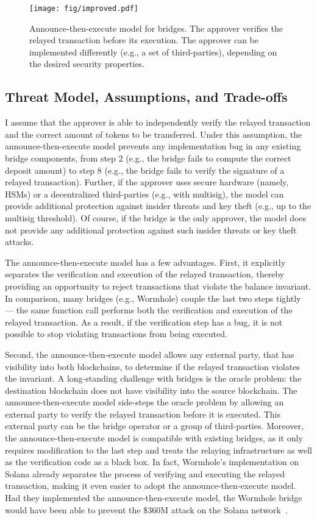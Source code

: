 \begin{figure}[t]
\centering
\texttt{[image: fig/improved.pdf]}
\caption[Announce-then-Execute Model for Bridges]{Announce-then-execute model for bridges. The approver verifies the relayed transaction before its execution. The approver can be implemented differently (e.g., a set of third-parties), depending on the desired security properties.}
\label{fig:improved-arch}
\end{figure}


\subsection{Threat Model, Assumptions, and Trade-offs}
I assume that the approver is able to independently verify the relayed transaction and the correct amount of tokens to be transferred. Under this assumption, the announce-then-execute model prevents any implementation bug in any existing bridge components, from step 2 (e.g., the bridge fails to compute the correct deposit amount) to step 8 (e.g., the bridge fails to verify the signature of a relayed transaction). Further, if the 
approver uses secure hardware (namely, HSMs) or a decentralized third-parties
(e.g., with multisig), the model can provide additional protection against
insider threats and key theft (e.g., up to the multisig threshold). Of course,
if the bridge is the only approver, the model does not provide any additional
protection against such insider threats or key theft attacks.


The announce-then-execute model has a few advantages. First, it
explicitly separates the verification and execution of the relayed
transaction, thereby providing an opportunity to reject transactions
that violate the balance invariant.  In comparison, many bridges (e.g.,
Wormhole) couple the last two steps tightly --- the same function call
performs both the verification and execution of the relayed
transaction.  As a result, if the verification step has a bug, it is
not possible to stop violating transactions from being
executed.

Second, the announce-then-execute model allows any external
party, that has visibility into both blockchains, to determine if the
relayed transaction violates the invariant. A long-standing challenge
with bridges is the oracle problem: the destination blockchain does
not have visibility into the source blockchain. The
announce-then-execute model side-steps the oracle problem by allowing
an external party to verify the relayed transaction before it is
executed. This external party can be the bridge operator or a group of third-parties.
Moreover, the announce-then-execute model is compatible with
existing bridges, as it only requires modification to the last step
and treats the relaying infrastructure as well as the verification
code as a black box. In fact, Wormhole's implementation on Solana already separates the process of verifying and executing the relayed transaction, making it even easier to adopt the announce-then-execute model. Had they implemented the announce-then-execute model, the Wormhole bridge would have been able to prevent the \$360M attack on the Solana network~\cite{wormholeattack}.

